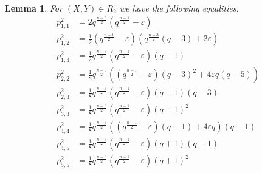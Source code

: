 \documentclass[a4paper]{article}
\newtheorem{lm}[thm]{Lemma}
\theoremstyle{definition}
\newcommand{\eps}{\varepsilon}
\begin{document}
\begin{lm}
 \label{lem:R2relations}
    For $(X,Y)\in R_{2}$ we have the following equalities.
    {\allowdisplaybreaks \begin{align*}
        p^{2}_{1,1}&=2q^{\frac{n-3}{2}}\left(q^{\frac{n-1}{2}}-\eps\right)\\
        p^{2}_{1,2}&=\frac{1}{2}\left(q^{\frac{n-1}{2}}-\eps\right)\left(q^{\frac{n-3}{2}}\left(q-3\right)+2\eps\right)\\
        p^{2}_{1,3}&=\frac{1}{2}q^{\frac{n-3}{2}}\left(q^{\frac{n-1}{2}}-\eps \right)\left(q-1\right)\\
        p^{2}_{2,2}&=\frac{1}{8}q^{\frac{n-3}{2}}\left(\left(q^{\frac{n-1}{2}}-\eps\right)(q-3)^{2}+4\eps q(q-5)\right)\\
        p^{2}_{2,3}&=\frac{1}{8}q^{\frac{n-3}{2}}\left(q^{\frac{n-1}{2}}-\eps\right)\left(q-1\right)\left(q-3\right)\\
        p^{2}_{3,3}&=\frac{1}{8}q^{\frac{n-3}{2}}\left(q^{\frac{n-1}{2}}-\eps\right)\left(q-1\right)^{2}\\
        p^{2}_{4,4}&=\frac{1}{8}q^{\frac{n-3}{2}}\left(\left(q^{\frac{n-1}{2}}-\eps\right)(q-1)+4\eps q\right)\left(q-1\right)\\
        p^{2}_{4,5}&=\frac{1}{8}q^{\frac{n-3}{2}}\left(q^{\frac{n-1}{2}}-\eps \right)\left(q+1\right)\left(q-1\right)\\
        p^{2}_{5,5}&=\frac{1}{8}q^{\frac{n-3}{2}}\left(q^{\frac{n-1}{2}}-\eps \right)\left(q+1\right)^{2}
    \end{align*}}
\end{lm}
\end{document}
